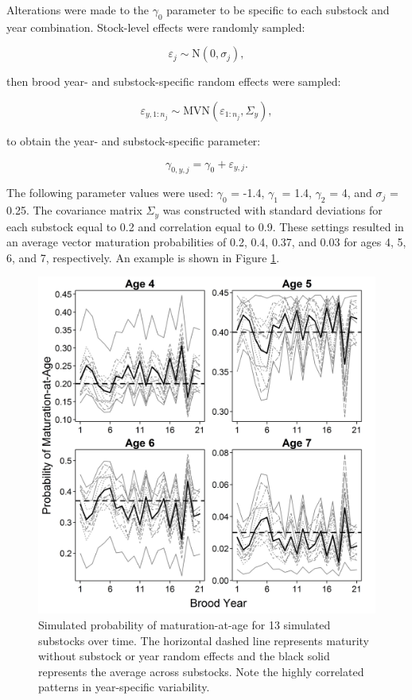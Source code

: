 \documentclass[12pt,]{book}
\theoremstyle{definition}
\theoremstyle{definition}
\theoremstyle{definition}
\theoremstyle{remark}
\begin{document}
\noindent
Alterations were made to the \(\gamma_0\) parameter to be specific to
each substock and year combination. Stock-level effects were randomly
sampled:

\[\varepsilon_{j} \sim \text{N}(0, \sigma_{j}),\]

\noindent
then brood year- and substock-specific random effects were sampled:

\[\varepsilon_{y,1:n_j} \sim \text{MVN}(\varepsilon_{1:n_j}, \Sigma_{y}),\]

\noindent
to obtain the year- and substock-specific parameter:

\[\gamma_{0,y,j} = \gamma_0 + \varepsilon_{y,j}.\]

The following parameter values were used: \(\gamma_0\) = -1.4,
\(\gamma_1\) = 1.4, \(\gamma_2\) = 4, and \(\sigma_{j}\) = 0.25. The
covariance matrix \(\Sigma_y\) was constructed with standard deviations
for each substock equal to 0.2 and correlation equal to 0.9. These
settings resulted in an average vector maturation probabilities of 0.2,
0.4, 0.37, and 0.03 for ages 4, 5, 6, and 7, respectively. An example is
shown in Figure \ref{fig:maturity-sim-fig}.

\begin{figure}
  \centering
  \includegraphics{img/Ch4/maturity-sim-fig.jpg}
  \caption{Simulated probability of maturation-at-age for 13 simulated substocks over time. The horizontal dashed line represents maturity without substock or year random effects and the black solid represents the average across substocks. Note the highly correlated patterns in year-specific variability.}
  \label{fig:maturity-sim-fig}
\end{figure}

\singlespacing
\setlength{\parskip}{6pt plus 2pt minus 1pt}


\end{document}
